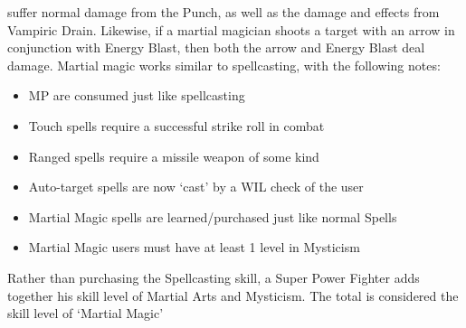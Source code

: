 \documentclass[twoside]{book}
\begin{document}
               suffer normal damage from the Punch, as well as the damage
               and effects from Vampiric Drain. Likewise, if a martial
               magician shoots a target with an arrow in conjunction with
               Energy Blast, then both the arrow and Energy Blast deal
               damage.   Martial magic works similar to spellcasting, with
               the following notes: 
\begin{itemize}
      
  \item   MP are consumed just like spellcasting 
  \item   Touch spells require a successful strike roll in
                 combat 
  \item   Ranged spells require a missile weapon of some
                 kind 
  \item   Auto-target spells are now `cast' by
                 a WIL check of the user 
  \item   Martial Magic spells are learned/purchased just
                 like normal Spells 
  \item   Martial Magic users must have at least 1 level in
                 Mysticism 
\end{itemize}
    Rather than purchasing the Spellcasting skill, a
               Super Power Fighter adds together his skill level of
               Martial Arts and Mysticism. The total is considered the
               skill level of `Martial Magic' 
    
\end{document}
